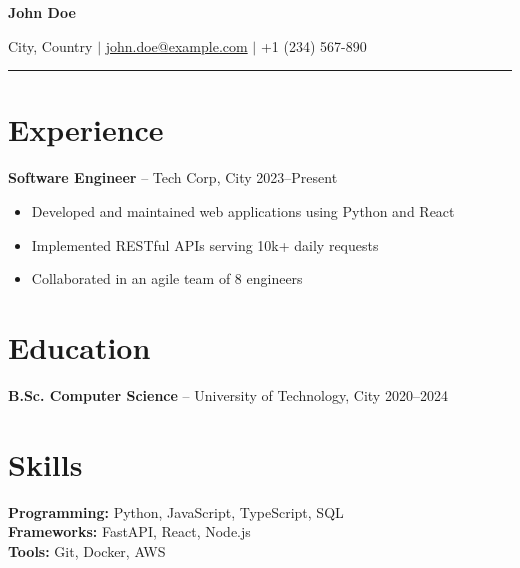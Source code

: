 \documentclass[11pt,a4paper]{article}
\begin{document}
{\LARGE\bfseries John Doe}

\vspace{4pt}
City, Country $\vert$ \href{mailto:john.doe@example.com}{john.doe@example.com} $\vert$ +1 (234) 567-890

\vspace{12pt}
\hrule
\vspace{12pt}

\section*{Experience}

\textbf{Software Engineer} -- Tech Corp, City \hfill 2023--Present
\begin{itemize}
    \item Developed and maintained web applications using Python and React
    \item Implemented RESTful APIs serving 10k+ daily requests
    \item Collaborated in an agile team of 8 engineers
\end{itemize}

\section*{Education}

\textbf{B.Sc. Computer Science} -- University of Technology, City \hfill 2020--2024

\section*{Skills}

\textbf{Programming:} Python, JavaScript, TypeScript, SQL\\
\textbf{Frameworks:} FastAPI, React, Node.js\\
\textbf{Tools:} Git, Docker, AWS
\end{document}
